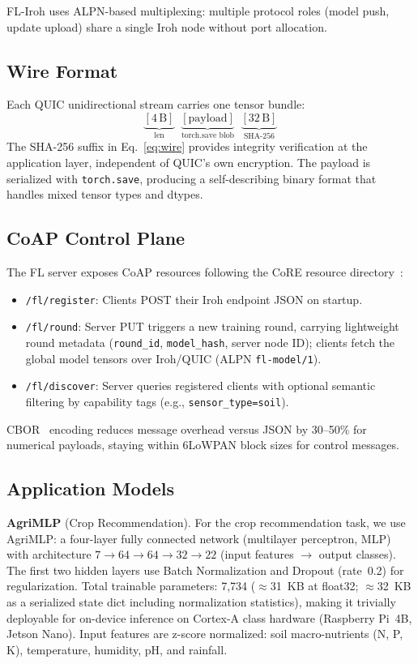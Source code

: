 ﻿\documentclass[journal]{IEEEtran}
\begin{document}
FL-Iroh uses ALPN-based multiplexing: multiple protocol roles (model push, update upload) share a single Iroh node without port allocation.

\subsection{Wire Format}

Each QUIC unidirectional stream carries one tensor bundle:
\begin{equation}
\underbrace{[4\,\text{B}]}_{\text{len}} \;\; \underbrace{[\text{payload}]}_{\text{torch.save blob}} \;\; \underbrace{[32\,\text{B}]}_{\text{SHA-256}}
\label{eq:wire}
\end{equation}
The SHA-256 suffix in Eq.~\eqref{eq:wire} provides integrity verification at the application layer, independent of QUIC's own encryption. The payload is serialized with \texttt{torch.save}, producing a self-describing binary format that handles mixed tensor types and dtypes.

\subsection{CoAP Control Plane}

The FL server exposes CoAP resources following the CoRE resource directory~\cite{rfc6690}:
\begin{itemize}
    \item \texttt{/fl/register}: Clients POST their Iroh endpoint JSON on startup.
    \item \texttt{/fl/round}: Server PUT triggers a new training round, carrying lightweight round metadata (\texttt{round\_id}, \texttt{model\_hash}, server node ID); clients fetch the global model tensors over Iroh/QUIC (ALPN \texttt{fl-model/1}).
    \item \texttt{/fl/discover}: Server queries registered clients with optional semantic filtering by capability tags (e.g., \texttt{sensor\_type=soil}).
\end{itemize}

CBOR~\cite{rfc8949} encoding reduces message overhead versus JSON by 30--50\% for numerical payloads, staying within 6LoWPAN block sizes for control messages.

\subsection{Application Models}

\textbf{AgriMLP} (Crop Recommendation). For the crop recommendation task, we use AgriMLP: a four-layer fully connected network (multilayer perceptron, MLP) with architecture $7 \to 64 \to 64 \to 32 \to 22$ (input features $\to$ output classes). The first two hidden layers use Batch Normalization and Dropout (rate~0.2) for regularization. Total trainable parameters: 7{,}734 ($\approx$31~KB at float32; $\approx$32~KB as a serialized state dict including normalization statistics), making it trivially deployable for on-device inference on Cortex-A class hardware (Raspberry Pi~4B, Jetson Nano). Input features are z-score normalized: soil macro-nutrients (N, P, K), temperature, humidity, pH, and rainfall.
\end{document}
